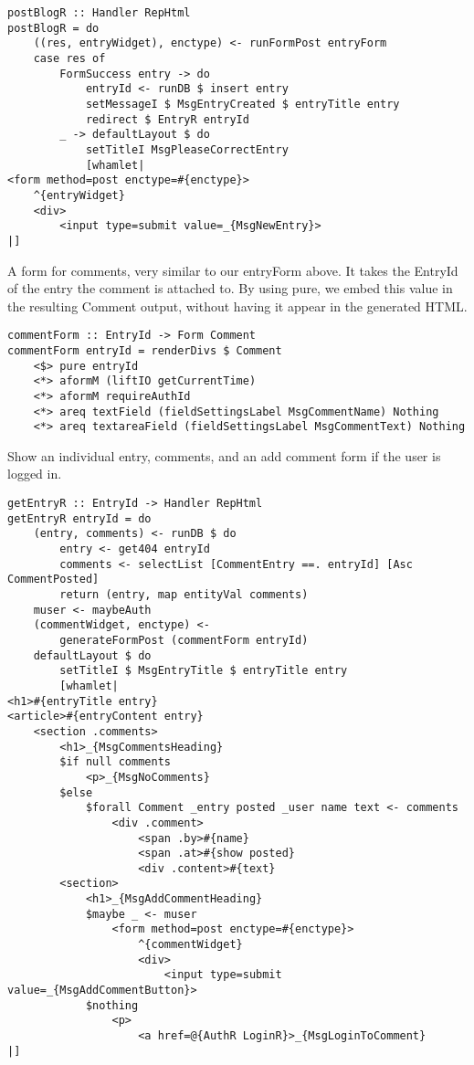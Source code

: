 \begin{lstlisting}
postBlogR :: Handler RepHtml
postBlogR = do
    ((res, entryWidget), enctype) <- runFormPost entryForm
    case res of
        FormSuccess entry -> do
            entryId <- runDB $ insert entry
            setMessageI $ MsgEntryCreated $ entryTitle entry
            redirect $ EntryR entryId
        _ -> defaultLayout $ do
            setTitleI MsgPleaseCorrectEntry
            [whamlet|
<form method=post enctype=#{enctype}>
    ^{entryWidget}
    <div>
        <input type=submit value=_{MsgNewEntry}>
|]
\end{lstlisting}

A form for comments, very similar to our entryForm above. It takes the EntryId of the entry the comment is attached to. By using pure, we embed this value in the resulting Comment output, without having it appear in the generated HTML.

\begin{lstlisting}
commentForm :: EntryId -> Form Comment
commentForm entryId = renderDivs $ Comment
    <$> pure entryId
    <*> aformM (liftIO getCurrentTime)
    <*> aformM requireAuthId
    <*> areq textField (fieldSettingsLabel MsgCommentName) Nothing
    <*> areq textareaField (fieldSettingsLabel MsgCommentText) Nothing
\end{lstlisting}

Show an individual entry, comments, and an add comment form if the user is logged in.

\begin{lstlisting}
getEntryR :: EntryId -> Handler RepHtml
getEntryR entryId = do
    (entry, comments) <- runDB $ do
        entry <- get404 entryId
        comments <- selectList [CommentEntry ==. entryId] [Asc CommentPosted]
        return (entry, map entityVal comments)
    muser <- maybeAuth
    (commentWidget, enctype) <-
        generateFormPost (commentForm entryId)
    defaultLayout $ do
        setTitleI $ MsgEntryTitle $ entryTitle entry
        [whamlet|
<h1>#{entryTitle entry}
<article>#{entryContent entry}
    <section .comments>
        <h1>_{MsgCommentsHeading}
        $if null comments
            <p>_{MsgNoComments}
        $else
            $forall Comment _entry posted _user name text <- comments
                <div .comment>
                    <span .by>#{name}
                    <span .at>#{show posted}
                    <div .content>#{text}
        <section>
            <h1>_{MsgAddCommentHeading}
            $maybe _ <- muser
                <form method=post enctype=#{enctype}>
                    ^{commentWidget}
                    <div>
                        <input type=submit value=_{MsgAddCommentButton}>
            $nothing
                <p>
                    <a href=@{AuthR LoginR}>_{MsgLoginToComment}
|]
\end{lstlisting}

